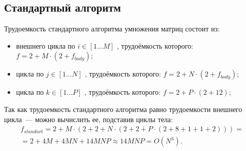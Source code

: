 \subsection*{Стандартный алгоритм}
Трудоемкость стандартного алгоритма умножения матриц состоит из:
\begin{itemize}
	\item внешнего цикла по $i \in [1 \ldots M]$ , трудоёмкость которого: $f = 2 + M \cdot (2 + f_{body})$;
	\item цикла по $j \in [1 \ldots N]$ , трудоёмкость которого: $f = 2 + N \cdot (2 + f_{body})$;
	\item цикла по $k \in [1 \ldots P]$ , трудоёмкость которого: $f = 2 + P \cdot (2 + 12)$;
\end{itemize}
Так как трудоемкость стандартного алгоритма равно трудоемкости внешнего цикла~--- можно вычислить ее, подставив циклы тела:
\begin{equation}
	\begin{gathered}
		f_{standart} = 2 + M \cdot (2 + 2 + N \cdot (2 + 2 + P \cdot (2 + 8 + 1 + 1 + 2))) = \\
		= 2 + 4M + 4MN + 14MNP \approx 14MNP = O(N^3).
	\end{gathered}
\end{equation}


